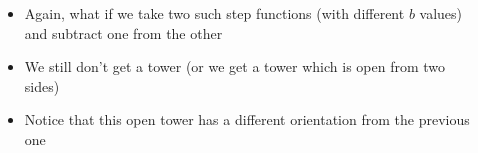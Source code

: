 \begin{frame}
	\begin{columns}
		\begin{overlayarea}{\textwidth}{\textheight}
			
		\end{overlayarea}
		\begin{overlayarea}{\textwidth}{\textheight}
			\begin{itemize}\justifying
				\item<1-> Again, what if we take two such step functions (with different $b$ values) and subtract one from the other
				\item<4-> We still don't get a tower (or we get a tower which is open from two sides)
				\item<5-> Notice that this open tower has a different orientation from the previous one
			\end{itemize}
		\end{overlayarea}
	\end{columns}
\end{frame}

